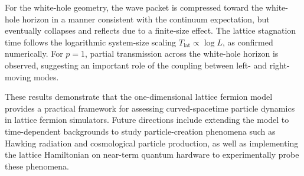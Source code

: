 \documentclass[reprint,amsmath,amssymb,aps,prb]{revtex4-2}
\begin{document}
For the white-hole geometry, the wave packet is compressed toward the white-hole horizon in a manner consistent with the continuum expectation, but eventually collapses and reflects due to a finite-size effect. The lattice stagnation time follows the logarithmic system-size scaling $T_{\mathrm{lat}}\propto\log L$, as confirmed numerically. For $p=1$, partial transmission across the white-hole horizon is observed, suggesting an important role of the coupling between left- and right-moving modes.

These results demonstrate that the one-dimensional lattice fermion model provides a practical framework for assessing curved-spacetime particle dynamics in lattice fermion simulators. Future directions include extending the model to time-dependent backgrounds to study particle-creation phenomena such as Hawking radiation and cosmological particle production, as well as implementing the lattice Hamiltonian on near-term quantum hardware to experimentally probe these phenomena.


\end{document}
